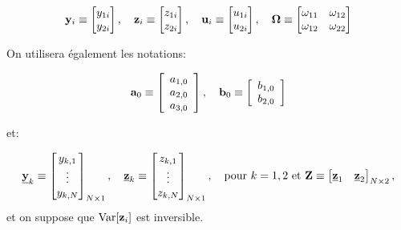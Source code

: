  \[
    {\mathbf y}_i \equiv 
    \begin{bmatrix}
        y_{1i}\\
        y_{2i}
    \end{bmatrix}
    , \quad 
    {\mathbf z}_i \equiv 
\begin{bmatrix}
    z_{1i}\\
    z_{2i}
\end{bmatrix}
, \quad 
{\mathbf u}_i \equiv 
\begin{bmatrix}
    u_{1i}\\
    u_{2i}
\end{bmatrix}
, \quad 
{\boldsymbol \Omega} \equiv
\begin{bmatrix}
    \omega_{11}&\omega_{12}\\
    \omega_{12}&\omega_{22}
\end{bmatrix}
 \]
    
 On utilisera également les notations:


 \begin{align*}
    {\mathbf a}_0 \equiv 
    \left[
    \begin{array}{l}
        a_{1,0}\\
        a_{2, 0}\\
        a_{3, 0}
    \end{array}
    \right]
    , \quad 
    {\mathbf b}_0 \equiv 
 \left[
 \begin{array}{l}
    b_{1,0}\\
    b_{2,0}
\end{array}
 \right]
\end{align*}

et:

\[
    \underline{{\mathbf y}}_k \equiv 
    \begin{bmatrix}
        y_{k,1}\\
        \vdots\\
        y_{k, N}
    \end{bmatrix}_{N\times 1}
    , \quad 
    \underline{{\mathbf z}}_k \equiv
        \begin{bmatrix}
        z_{k,1}\\
        \vdots\\
        z_{k, N}
    \end{bmatrix}_{N\times 1}
    , \quad \text{pour $k=1, 2$ et} \
    \mathbf Z \equiv 
\begin{bmatrix}
    \underline{{\mathbf z}}_1& \underline{{\mathbf z}}_2
\end{bmatrix}_{N\times 2},
\]
et on suppose que $\operatorname{Var}[{\mathbf z}_i]$ est inversible.

